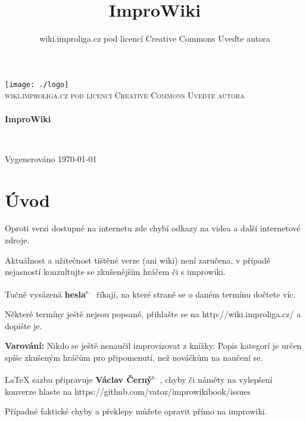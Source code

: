 \documentclass[a4paper,10pt,openany]{book}
\title{ImproWiki}
\author{wiki.improliga.cz pod licencí Creative Commons Uveďte autora}
\newcommand{\odkaz}[2]{\textbf{#1}\textsuperscript{s.~\pageref{#2}}}
\begin{document}
\begin{titlepage}
\begin{center}

\texttt{[image: ./logo]}~\\[2cm]

\textsc{\Large wiki.improliga.cz pod licencí Creative Commons Uveďte autora }\\[0.5cm]

\HRule \\[0.4cm]
{ \huge \bfseries ImproWiki \\[0.4cm] }

\HRule \\[1.5cm]


\vfill

{\large Vygenerováno \today}

\end{center}




\end{titlepage}
 
\chapter{Úvod}\label{úvod}

 

Oproti verzi dostupné na internetu zde chybí odkazy na videa a další internetové zdroje.

Aktuálnost a užitečnost tištěné verze (ani wiki) není zaručena, v případě nejasností konzultujte se zkušenějším hráčem či s improwiki.

Tučně vysázená \odkaz{hesla}{úvod} říkají, na které straně se o daném termínu dočtete víc.

Některé termíny ještě nejsou popsané, přihlašte se na http://wiki.improliga.cz/ a dopište je.

\textbf{Varování:} Nikdo se ještě nenaučil improvizovat z knížky. Popis kategorí je určen spíše zkušeným hráčům pro připomenutí, než nováčkům na naučení se.  

\LaTeX{} sazbu připravuje  \odkaz{Václav Černý}{uživatel:vatoz}, chyby či náměty na vylepšení konverze hlaste na https://github.com/vatoz/improwikibook/issues

Případné faktické chyby a překlepy můžete opravit přímo na improwiki.
\end{document}
